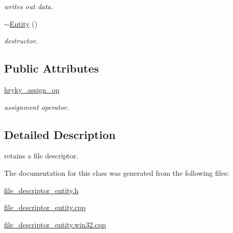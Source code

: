 \begin{DoxyCompactItemize}
\begin{DoxyCompactList}\small\item\em writes out data. \end{DoxyCompactList}\item 
\hypertarget{classhryky_1_1file_1_1descriptor_1_1_entity_a9edf4a9f8201db7ad670029c4c67d281}{\hyperlink{classhryky_1_1file_1_1descriptor_1_1_entity_a9edf4a9f8201db7ad670029c4c67d281}{$\sim$\-Entity} ()}\label{classhryky_1_1file_1_1descriptor_1_1_entity_a9edf4a9f8201db7ad670029c4c67d281}

\begin{DoxyCompactList}\small\item\em destructor. \end{DoxyCompactList}\end{DoxyCompactItemize}
\subsection*{Public Attributes}
\begin{DoxyCompactItemize}
\item 
\hypertarget{classhryky_1_1file_1_1descriptor_1_1_entity_aa3deebac243bf8d517e08a9a300eee95}{\hyperlink{classhryky_1_1file_1_1descriptor_1_1_entity_aa3deebac243bf8d517e08a9a300eee95}{hryky\-\_\-assign\-\_\-op}}\label{classhryky_1_1file_1_1descriptor_1_1_entity_aa3deebac243bf8d517e08a9a300eee95}

\begin{DoxyCompactList}\small\item\em assignment operator. \end{DoxyCompactList}\end{DoxyCompactItemize}


\subsection{Detailed Description}
retains a file descriptor. 

The documentation for this class was generated from the following files\-:\begin{DoxyCompactItemize}
\item 
\hyperlink{file__descriptor__entity_8h}{file\-\_\-descriptor\-\_\-entity.\-h}\item 
\hyperlink{file__descriptor__entity_8cpp}{file\-\_\-descriptor\-\_\-entity.\-cpp}\item 
\hyperlink{file__descriptor__entity_8win32_8cpp}{file\-\_\-descriptor\-\_\-entity.\-win32.\-cpp}\end{DoxyCompactItemize}
